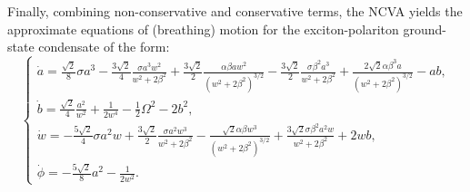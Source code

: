 {%
 
Finally, combining non-conservative and conservative terms, the NCVA yields
the approximate 
equations of (breathing) motion for the exciton-polariton 
ground-state condensate of the form:
 \begin{equation}
 \begin{cases}
  \dot{a} = \frac{\sqrt{2}}{8} \sigma a^3 -\frac{3\sqrt{2}}{4} \frac{\sigma a^3 w^2}{w^2 + 2\beta^2 } + \frac{3\sqrt{2}}{2} \frac{\alpha \beta a w^2}{\left( w^2 + 2 \beta^2 \right)^{3/2}} -\frac{3\sqrt{2}}{2} \frac{\sigma \beta^2 a^3 }{w^2 + 2\beta^2} + \frac{2\sqrt{2} \alpha \beta^3 a}{\left( w^2 + 2\beta^2\right)^{3/2}} - ab , \\
\dot{b}  = \frac{\sqrt{2}}{4} \frac{a^2}{w^2} + \frac{1}{2 w^4} - \frac{1}{2} \Omega^2 - 2b^2, \\
\dot{w} = -\frac{5\sqrt{2}}{4} \sigma a^2 w + \frac{3\sqrt{2}}{2} \frac{\sigma a^2 w^3}{w^2 + 2\beta^2} - \frac{\sqrt{2} \alpha \beta w^3}{\left( w^2 + 2\beta^2 \right)^{3/2}} +\frac{3\sqrt{2} \sigma \beta^2 a^2 w }{w^2 + 2\beta^2} + 2 w b, \\
\dot{\phi} = -\frac{5\sqrt{2}}{8} a^2 -\frac{1}{2w^2} .
\end{cases}
 \label{eq:NCVAP}
 \end{equation}
 
}
